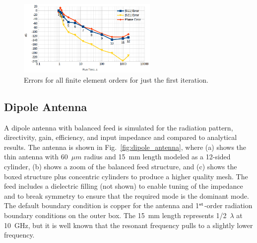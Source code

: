 \documentclass[titlepage]{article}
\renewcommand\_{\textunderscore\linebreak[1]}
\begin{document}
\begin{figure}[H]
  \centering
  \includegraphics[width=0.6\textwidth]{../regression/OpenParEM3D/WR90/straight_study/screenshots/FirstIteration}
  \caption{Errors for all finite element orders for just the first iteration.}
  \label{fig:FirstIteration}
\end{figure}

\subsection{Dipole Antenna}

A dipole antenna with balanced feed is simulated for the radiation pattern, directivity, gain, efficiency, and input impedance and compared to analytical results.  The antenna is shown in Fig.~\ref{fig:dipole_antenna}, where (a) shows the thin antenna with 60~$\mu m$ radius and 15~mm length modeled as a 12-sided cylinder, (b) shows a zoom of the balanced feed structure, and (c) shows the boxed structure plus concentric cylinders to produce a higher quality mesh.  The feed includes a dielectric filling (not shown) to enable tuning of the impedance and to break symmetry to ensure that the required mode is the dominant mode.  The default boundary condition is copper for the antenna and 1$^{\textnormal{st}}$-order radiation boundary conditions on the outer box.  The 15~mm length represents 1/2~$\lambda$ at 10~GHz, but it is well known that the resonant frequency pulls to a slightly lower frequency.
\end{document}
